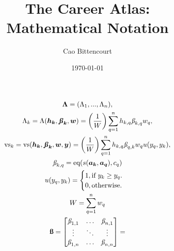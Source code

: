 \documentclass{article}
\title{
    The Career Atlas:\\
    Mathematical Notation
}
\author{Cao Bittencourt}
\date{\today}
\begin{document}
\maketitle

\begin{gather}
    \boldsymbol{\Lambda} = (\Lambda_{1}, ..., \Lambda_{n}),\\
    \Lambda_k = 
    \Lambda(\boldsymbol{h_{k}}, \boldsymbol{\textbf{\textit{\ss}}_{k}}, \boldsymbol{w}) = 
        \left(
            \frac{1}{W}
        \right)
        \sum_{q=1}^{n}{
            h_{k,q}
            \textit{\ss}_{k,q}
            w_q
        },\\
    \text{vs}_k = 
    \text{vs}(\boldsymbol{h_{k}}, \boldsymbol{\textbf{\textit{\ss}}_{k}}, \boldsymbol{w}, \boldsymbol{y}) = 
    \left(
        \frac{1}{W}
    \right)
        \sum_{q=1}^{n}{
            h_{k,q}
            \textit{\ss}_{q,k}
            w_q
            u(y_q,y_k)
        }
        ,\\
    \textit{\ss}_{k,q} = 
        \text{eq}(s(\boldsymbol{a_k},\boldsymbol{a_q}), c_q)\\
    u(y_q,y_k) =
    \begin{cases}
        1, \text{if } y_k \geq y_q.\\
        0, \text{otherwise.}
    \end{cases}\\
    W = 
        \sum_{q=1}^{n}{
            w_q
        }\\
    \textbf{\ss} = 
    \begin{bmatrix}
        \textit{\ss}_{1,1} & \hdots & \textit{\ss}_{n,1}\\
        \vdots & \ddots & \vdots\\
        \textit{\ss}_{1,n} & \hdots & \textit{\ss}_{n,n}\\
    \end{bmatrix} = 

\end{gather}
\end{document}
